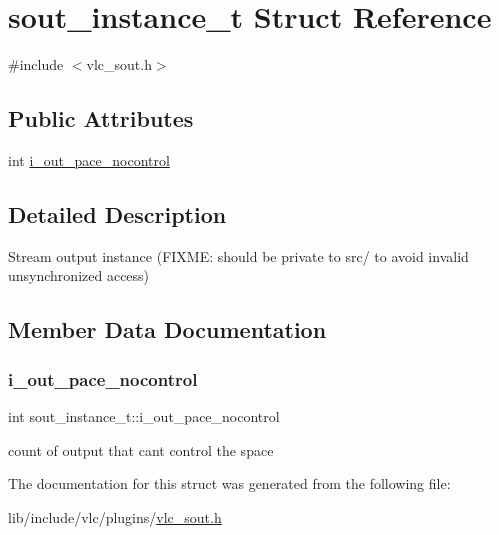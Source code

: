 \hypertarget{structsout__instance__t}{}\section{sout\+\_\+instance\+\_\+t Struct Reference}
\label{structsout__instance__t}


{\ttfamily \#include $<$vlc\+\_\+sout.\+h$>$}

\subsection*{Public Attributes}
\begin{DoxyCompactItemize}
\item 
int \hyperlink{structsout__instance__t_a55c1c27c76856e0a042d76ab57a994f3}{i\+\_\+out\+\_\+pace\+\_\+nocontrol}
\end{DoxyCompactItemize}


\subsection{Detailed Description}
Stream output instance (F\+I\+X\+ME\+: should be private to src/ to avoid invalid unsynchronized access) 

\subsection{Member Data Documentation}
\mbox{\label{structsout__instance__t_a55c1c27c76856e0a042d76ab57a994f3}} 
\subsubsection{\texorpdfstring{i\+\_\+out\+\_\+pace\+\_\+nocontrol}{i\_out\_pace\_nocontrol}}
{\footnotesize\ttfamily int sout\+\_\+instance\+\_\+t\+::i\+\_\+out\+\_\+pace\+\_\+nocontrol}

count of output that can\textquotesingle{}t control the space 

The documentation for this struct was generated from the following file\+:\begin{DoxyCompactItemize}
\item 
lib/include/vlc/plugins/\hyperlink{vlc__sout_8h}{vlc\+\_\+sout.\+h}\end{DoxyCompactItemize}
